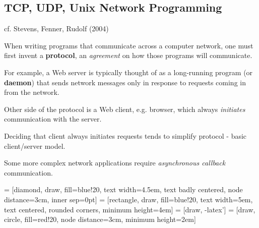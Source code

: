 \documentclass[10pt]{amsart}
\begin{document}
\begin{multicols*}{2}
\subsection{TCP, UDP, Unix Network Programming}

cf. Stevens, Fenner, Rudolf (2004) \cite{SFR2004}

When writing programs that communicate across a computer network, one must first invent a \textbf{protocol}, an \emph{agreement} on how those programs will communicate.

For example, a Web server is typically thought of as a long-running program (or \textbf{daemon}) that sends network messages only in response to requests coming in from the network.

Other side of the protocol is a Web client, e.g. browser, which always \emph{initiates} communication with the server.

Deciding that client always initiates requests tends to simplify protocol - basic client/server model.

Some more complex network applications require \emph{asynchronous callback} communication.


 = [diamond, draw, fill=blue!20, 
text width=4.5em, text badly centered, node distance=3cm, inner sep=0pt]
 = [rectangle, draw, fill=blue!20, 
text width=5em, text centered, rounded corners, minimum height=4em]
 = [draw, -latex']
 = [draw, circle, fill=red!20, node distance=3cm,
minimum height=2em]



\end{multicols*}
\end{document}
